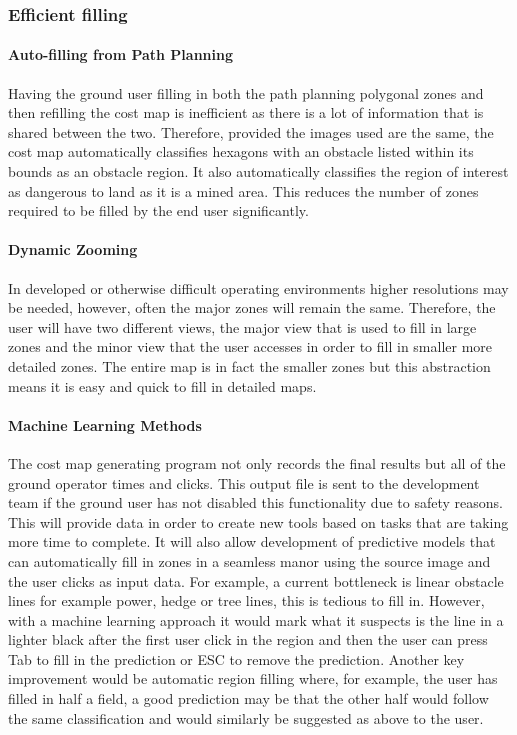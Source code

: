\subsubsection{Efficient filling}
\paragraph{Auto-filling from Path Planning}
Having the ground user filling in both the path planning polygonal zones and then refilling the cost map is inefficient as there is a lot of information that is shared between the two. Therefore, provided the images used are the same, the cost map automatically classifies hexagons with an obstacle listed within its bounds as an obstacle region. It also automatically classifies the region of interest as dangerous to land as it is a mined area. This reduces the number of zones required to be filled by the end user significantly. 
\paragraph{Dynamic Zooming}
In developed or otherwise difficult operating environments higher resolutions may be needed, however, often the major zones will remain the same. Therefore, the user will have two different views, the major view that is used to fill in large zones and the minor view that the user accesses in order to fill in smaller more detailed zones. The entire map is in fact the smaller zones but this abstraction means it is easy and quick to fill in detailed maps.
\paragraph{Machine Learning Methods}
The cost map generating program not only records the final results but all of the ground operator times and clicks. This output file is  sent to the development team if the ground user has not disabled this functionality due to safety reasons. This will provide data in order to create new tools based on tasks that are taking more time to complete. It will also allow development of predictive models that can automatically fill in zones in a seamless manor using the source image and the user clicks as input data. For example, a current bottleneck is linear obstacle lines for example power, hedge or tree lines, this is tedious to fill in. However, with a machine learning approach it would mark what it suspects is the line in a lighter black after the first user click in the region and then the user can press Tab to fill in the prediction or ESC to remove the prediction. Another key improvement would be automatic region filling where, for example, the user has filled in half a field, a good prediction may be that the other half would follow the same classification and would similarly be suggested as above to the user.

